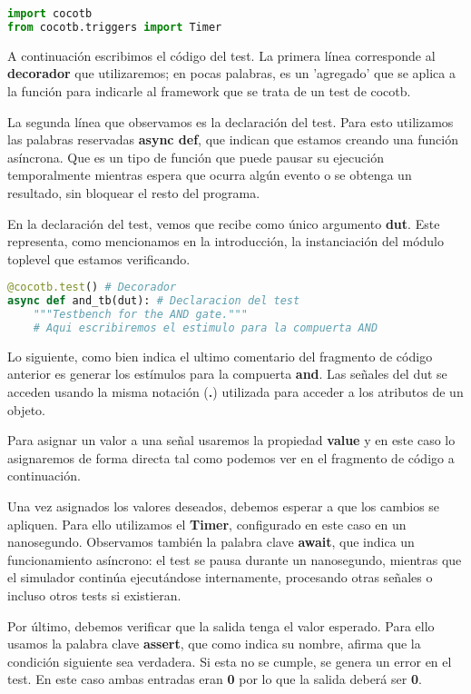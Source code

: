 \documentclass[a4paper,12pt]{article}
\begin{document}
\begin{lstlisting}[language=Python, caption=and\_tb.py, frame=lines]
import cocotb
from cocotb.triggers import Timer
\end{lstlisting}

A continuación escribimos el código del test. La primera línea corresponde al \textbf{decorador}  que utilizaremos; en pocas palabras, es un 'agregado' que se aplica a la función para indicarle al framework que se trata de un test de cocotb.

La segunda línea que observamos es la declaración del test. Para esto utilizamos las palabras reservadas \textbf{async def}, que indican que estamos creando una función asíncrona. Que es un tipo de función que puede pausar su ejecución temporalmente mientras espera que ocurra algún evento o se obtenga un resultado, sin bloquear el resto del programa.

En la declaración del test, vemos que recibe como único argumento \textbf{dut}. Este representa, como mencionamos en la introducción, la instanciación del módulo toplevel que estamos verificando.

\begin{lstlisting}[language=Python, caption=and\_tb.py, frame=lines]
@cocotb.test() # Decorador
async def and_tb(dut): # Declaracion del test
	"""Testbench for the AND gate."""
	# Aqui escribiremos el estimulo para la compuerta AND
\end{lstlisting}

Lo siguiente, como bien indica el ultimo comentario del fragmento de código anterior es generar los estímulos para la compuerta \textbf{and}. Las señales del dut se acceden usando la misma notación (\textbf{.}) utilizada para acceder a los atributos de un objeto.

Para asignar un valor a una señal usaremos la propiedad \textbf{value} y en este caso lo asignaremos de forma directa tal como podemos ver en el fragmento de código a continuación.

Una vez asignados los valores deseados, debemos esperar a que los cambios se apliquen. Para ello utilizamos el \textbf{Timer}, configurado en este caso en un nanosegundo. Observamos también la palabra clave \textbf{await}, que indica un funcionamiento asíncrono: el test se pausa durante un nanosegundo, mientras que el simulador continúa ejecutándose internamente, procesando otras señales o incluso otros tests si existieran.

Por último, debemos verificar que la salida tenga el valor esperado. Para ello usamos la palabra clave \textbf{assert}, que como indica su nombre, afirma que la condición siguiente sea verdadera. Si esta no se cumple, se genera un error en el test. En este caso ambas entradas eran \textbf{0} por lo que la salida deberá ser \textbf{0}.
\end{document}
